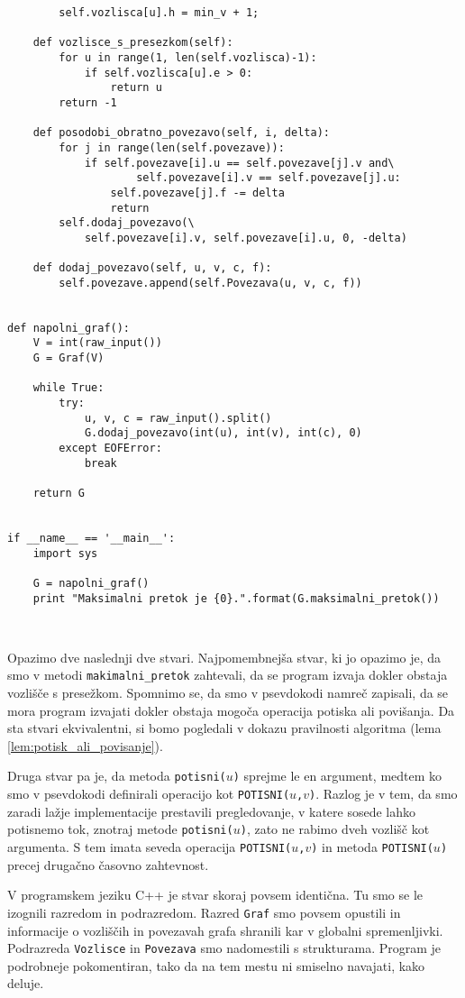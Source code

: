 \documentclass[mat1]{fmfdelo}
\begin{document}
\begin{verbatim}
        self.vozlisca[u].h = min_v + 1;
        
    def vozlisce_s_presezkom(self):
        for u in range(1, len(self.vozlisca)-1):
            if self.vozlisca[u].e > 0:
                return u
        return -1
        
    def posodobi_obratno_povezavo(self, i, delta):
        for j in range(len(self.povezave)):
            if self.povezave[i].u == self.povezave[j].v and\
                    self.povezave[i].v == self.povezave[j].u:
                self.povezave[j].f -= delta
                return
        self.dodaj_povezavo(\
            self.povezave[i].v, self.povezave[i].u, 0, -delta)
        
    def dodaj_povezavo(self, u, v, c, f):
        self.povezave.append(self.Povezava(u, v, c, f))
        

def napolni_graf():
    V = int(raw_input())
    G = Graf(V)
    
    while True:
        try:
            u, v, c = raw_input().split()
            G.dodaj_povezavo(int(u), int(v), int(c), 0)
        except EOFError:
            break
    
    return G
            
            
if __name__ == '__main__':
    import sys
    
    G = napolni_graf()
    print "Maksimalni pretok je {0}.".format(G.maksimalni_pretok())

\end{verbatim}~


Opazimo dve naslednji dve stvari. Najpomembnejša stvar, ki jo opazimo je, da smo v metodi \texttt{makimalni\_pretok} zahtevali, da se program izvaja dokler obstaja vozlišče s presežkom. Spomnimo se, da smo v psevdokodi namreč zapisali, da se mora program izvajati dokler obstaja mogoča operacija potiska ali povišanja. Da sta stvari ekvivalentni, si bomo pogledali v dokazu pravilnosti algoritma (lema \ref{lem:potisk_ali_povisanje}).

Druga stvar pa je, da metoda \texttt{potisni($u$)} sprejme le en argument, medtem ko smo v psevdokodi definirali operacijo kot \texttt{POTISNI($u$,$v$)}. Razlog je v tem, da smo zaradi lažje implementacije prestavili pregledovanje, v katere sosede lahko potisnemo tok, znotraj metode \texttt{potisni($u$)}, zato ne rabimo dveh vozlišč kot argumenta. S tem imata seveda operacija \texttt{POTISNI($u$,$v$)} in metoda \texttt{POTISNI($u$)} precej drugačno časovno zahtevnost.

V programskem jeziku C++ je stvar skoraj povsem identična. Tu smo se le izognili razredom in podrazredom. Razred \texttt{Graf} smo povsem opustili in informacije o vozliščih in povezavah grafa shranili kar v globalni spremenljivki. Podrazreda \texttt{Vozlisce} in \texttt{Povezava} smo nadomestili s strukturama. Program je podrobneje pokomentiran, tako da na tem mestu ni smiselno navajati, kako deluje.
\end{document}
